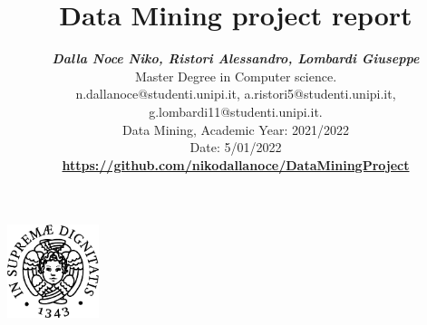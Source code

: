 \documentclass[11pt, letterpaper]{article}  %
\title{\vspace{-2cm}\textbf{Data Mining project report}}
\author{\textbf{\small{\textit{Dalla Noce Niko, Ristori Alessandro, Lombardi Giuseppe}}} \\ %
        \small{Master Degree in Computer science.}\\ \small{{n.dallanoce@studenti.unipi.it, a.ristori5@studenti.unipi.it, g.lombardi11@studenti.unipi.it}.} \\  %
        \small{Data Mining, Academic Year: 2021/2022} \\
        \small{Date: 5/01/2022} \\
       \textbf{\small{\url{https://github.com/nikodallanoce/DataMiningProject}}}
}
\begin{document}
\nocite{*}  %
\date{}
\maketitle
\begin{center}
    \includegraphics[width=0.2\textwidth]{images/unipi.png}\\
    \vspace{0.5cm}
\end{center}
\newpage
\tableofcontents
\newpage
%





\end{document}
